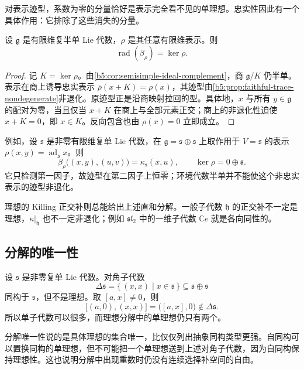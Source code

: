 对表示迹型，系数为零的分量恰好是表示完全看不见的单理想。忠实性因此有一个具体作用：它排除了这些消失的分量。

\begin{corollary}\label{b5:cor:semisimple-trace-kernel}
	设 \(\mathfrak g\) 是有限维复半单 Lie 代数，\(\rho\) 是其任意有限维表示。则
	\[
		\operatorname{rad}(\beta_\rho)=\ker\rho.
	\]
\end{corollary}
\begin{proof}
	记 \(K=\ker\rho\)。由\cref{b5:cor:semisimple-ideal-complement}，商 \(\mathfrak g/K\) 仍半单。表示在商上诱导忠实表示 \(\overline\rho(x+K)=\rho(x)\)，其迹型由\cref{b5:prop:faithful-trace-nondegenerate}非退化。原迹型正是沿商映射拉回的型。具体地，\(x\) 与所有 \(y\in\mathfrak g\) 的配对为零，当且仅当 \(x+K\) 在商上与全部元素正交；商上的非退化性迫使 \(x+K=0\)，即 \(x\in K\)。反向包含也由 \(\rho(x)=0\) 立即成立。
\end{proof}

例如，设 \(\mathfrak s\) 是非零有限维复单 Lie 代数，在 \(\mathfrak g=\mathfrak s\oplus\mathfrak s\) 上取作用于 \(V=\mathfrak s\) 的表示 \(\rho(x,y)=\operatorname{ad}_{\mathfrak s}x\)。则
\[
	\beta_\rho\bigl((x,y),(u,v)\bigr)=\kappa_{\mathfrak s}(x,u),\qquad \ker\rho=0\oplus\mathfrak s.
\]
它只检测第一因子，故迹型在第二因子上恒零；环境代数半单并不能使这个非忠实表示的迹型非退化。

理想的 Killing 正交补则总能给出上述直和分解。一般子代数 \(\mathfrak h\) 的正交补不一定是理想，\(\kappa|_{\mathfrak h}\) 也不一定非退化；例如 \(\mathfrak{sl}_2\) 中的一维子代数 \(\mathbb Ce\) 就是各向同性的。

\subsection{分解的唯一性}
\label{b5:subsec:1303:03}

\begin{example}\label{b5:exm:diagonal-simple-not-ideal}
	设 \(\mathfrak s\) 是非零复单 Lie 代数。对角子代数
	\[
		\Delta\mathfrak s=\bigl\{\,(x,x)\mid x\in\mathfrak s\,\bigr\} \subseteq\mathfrak s\oplus\mathfrak s
	\]
	同构于 \(\mathfrak s\)，但不是理想。取 \([a,x]\ne0\)，则
	\[
		\bigl[(a,0),(x,x)\bigr]=\bigl([a,x],0\bigr)\notin\Delta\mathfrak s.
	\]
	所以单子代数可以很多，而理想分解中的单理想仍只有两个。
\end{example}

分解唯一性说的是具体理想的集合唯一，比仅仅列出抽象同构类型更强。自同构可以置换同构的单理想，但不可能把一个单理想送到上述对角子代数，因为自同构保持理想性。这也说明分解中出现重数时仍没有连续选择补空间的自由。
